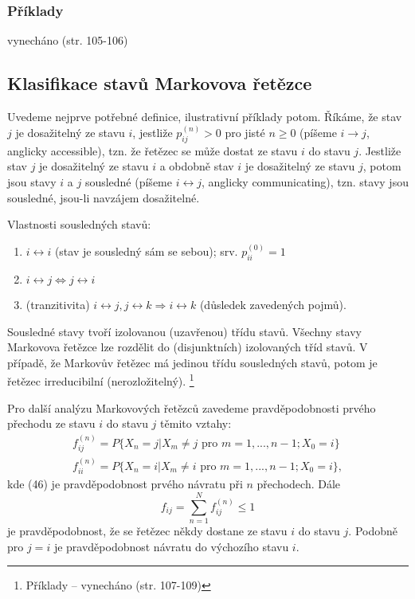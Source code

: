 \documentclass[10pt]{article}
\begin{document}
\subsubsection{Příklady}

vynecháno (str. 105-106)

\subsection{Klasifikace stavů Markovova řetězce}
Uvedeme nejprve potřebné definice, ilustrativní příklady potom. Říkáme, že stav $j$ je dosažitelný ze stavu $i$, jestliže $p_{ij}^{(n)}>0$ pro jisté $n \geq 0$ (píšeme $i \rightarrow j$, anglicky accessible), tzn. že řetězec se může dostat ze stavu $i$ do stavu $j$. Jestliže stav $j$ je dosažitelný ze stavu $i$ a obdobně stav $i$ je dosažitelný ze stavu $j$, potom jsou stavy $i$ a $j$ sousledné (píšeme $i \leftrightarrow j$, anglicky communicating), tzn. stavy jsou sousledné, jsou-li navzájem dosažitelné.

Vlastnosti sousledných stavů:
\begin{enumerate}
\item $i \leftrightarrow i$ (stav je sousledný sám se sebou); srv. $p_{ii}^{(0)} = 1$
\item $i \leftrightarrow j \Leftrightarrow j \leftrightarrow i$
\item (tranzitivita) $i \leftrightarrow j, j \leftrightarrow k \Rightarrow i \leftrightarrow k$ (důsledek zavedených pojmů).
\end{enumerate}
Sousledné stavy tvoří izolovanou (uzavřenou) třídu stavů. Všechny stavy Markovova řetězce lze rozdělit do (disjunktních) izolovaných tříd stavů. V případě, že Markovův řetězec má jedinou třídu sousledných stavů, potom je řetězec irreducibilní (nerozložitelný).
\footnote{Příklady -- vynecháno (str. 107-109)}

Pro další analýzu Markovových řetězců zavedeme pravděpodobnosti prvého přechodu ze stavu $i$ do stavu $j$ těmito vztahy:
\begin{gather}
f_{ij}^{(n)} = P\{X_n=j|X_m \neq j \text{ pro }m=1,...,n-1;X_0=i\}\\
f_{ii}^{(n)} = P\{X_n=i|X_m \neq i \text{ pro }m=1,...,n-1;X_0=i\},
\end{gather}
kde (46) je pravděpodobnost prvého návratu při $n$ přechodech. Dále \begin{equation}
f_{ij} = \sum_{n=1}^{N} f_{ij}^{(n)} \leq 1
\end{equation} je pravděpodobnost, že se řetězec někdy dostane ze stavu $i$ do stavu $j$. Podobně pro $j=i$ je pravděpodobnost návratu do výchozího stavu $i$.
\end{document}
